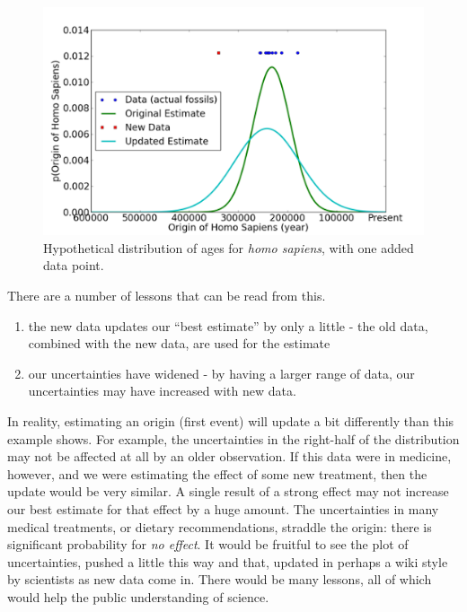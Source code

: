 \begin{figure}[htbp]
\centering
\includegraphics{img/blah3-2011-01-29-11-35.png}
\caption{Hypothetical distribution of ages for {\em homo sapiens}, with one added data point.}
\end{figure}

There are a number of lessons that can be read from this.

\begin{enumerate}
\def\labelenumi{\arabic{enumi}.}
\itemsep1pt\parskip0pt
\item
  the new data updates our ``best estimate'' by only a little - the old
  data, combined with the new data, are used for the estimate
\item
  our uncertainties have widened - by having a larger range of data, our
  uncertainties may have increased with new data.
\end{enumerate}

In reality, estimating an origin (first event) will update a bit
differently than this example shows. For example, the uncertainties in
the right-half of the distribution may not be affected at all by an
older observation. If this data were in medicine, however, and we were
estimating the effect of some new treatment, then the update would be
very similar. A single result of a strong effect may not increase our
best estimate for that effect by a huge amount. The uncertainties in
many medical treatments, or dietary recommendations, straddle the
origin: there is significant probability for \emph{no effect}. It would
be fruitful to see the plot of uncertainties, pushed a little this way
and that, updated in perhaps a wiki style by scientists as new data come
in. There would be many lessons, all of which would help the public
understanding of science.

